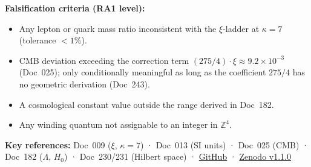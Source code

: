 \noindent\textbf{Falsification criteria (RA1 level):}
\begin{itemize}[nosep,itemsep=1pt]
  \item Any lepton or quark mass ratio inconsistent with the $\xi$-ladder at $\kappa=7$ (tolerance $<1\%$).
  \item CMB deviation exceeding the correction term $(275/4)\cdot\xi \approx 9.2\times10^{-3}$ (Doc~025); only conditionally meaningful as long as the coefficient $275/4$ has no geometric derivation (Doc~243).
  \item A cosmological constant value outside the range derived in Doc~182.
  \item Any winding quantum not assignable to an integer in $\mathbb{Z}^4$.
\end{itemize}

\vspace{0.3em}
\noindent\textbf{Key references:}
Doc~009 ($\xi$, $\kappa=7$) ·
Doc~013 (SI units) ·
Doc~025 (CMB) ·
Doc~182 ($\Lambda$, $H_0$) ·
Doc~230/231 (Hilbert space) ·
\href{https://github.com/jpascher/T0-Time-Mass-Duality}{GitHub} ·
\href{https://doi.org/10.5281/zenodo.20117635}{Zenodo v1.1.0}
